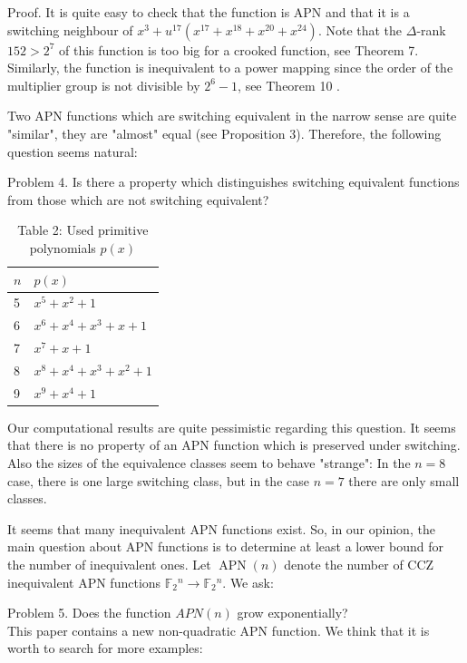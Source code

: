 \documentclass[10pt]{article}
\begin{document}
Proof. It is quite easy to check that the function is APN and that it is a switching neighbour of $x^{3}+u^{17}\left(x^{17}+x^{18}+x^{20}+x^{24}\right)$. Note that the $\Delta$-rank $152>2^{7}$ of this function is too big for a crooked function, see Theorem 7. Similarly, the function is inequivalent to a power mapping since the order of the multiplier group is not divisible by $2^{6}-1$, see Theorem 10 .

Two APN functions which are switching equivalent in the narrow sense are quite "similar", they are "almost" equal (see Proposition 3). Therefore, the following question seems natural:

Problem 4. Is there a property which distinguishes switching equivalent functions from those which are not switching equivalent?

\begin{table}[h]
\begin{center}
\begin{tabular}{|l|l|}
\hline
$n$ & $p(x)$ \\
\hline
5 & $x^{5}+x^{2}+1$ \\
\hline
6 & $x^{6}+x^{4}+x^{3}+x+1$ \\
\hline
7 & $x^{7}+x+1$ \\
\hline
8 & $x^{8}+x^{4}+x^{3}+x^{2}+1$ \\
\hline
9 & $x^{9}+x^{4}+1$ \\
\hline
\end{tabular}
\captionsetup{labelformat=empty}
\caption{Table 2: Used primitive polynomials $p(x)$}
\end{center}
\end{table}

Our computational results are quite pessimistic regarding this question. It seems that there is no property of an APN function which is preserved under switching. Also the sizes of the equivalence classes seem to behave "strange": In the $n=8$ case, there is one large switching class, but in the case $n=7$ there are only small classes.

It seems that many inequivalent APN functions exist. So, in our opinion, the main question about APN functions is to determine at least a lower bound for the number of inequivalent ones. Let $\operatorname{APN}(n)$ denote the number of CCZ inequivalent APN functions $\mathbb{F}_{2}{ }^{n} \rightarrow \mathbb{F}_{2}{ }^{n}$. We ask:

Problem 5. Does the function $A P N(n)$ grow exponentially?\\
This paper contains a new non-quadratic APN function. We think that it is worth to search for more examples:
\end{document}
